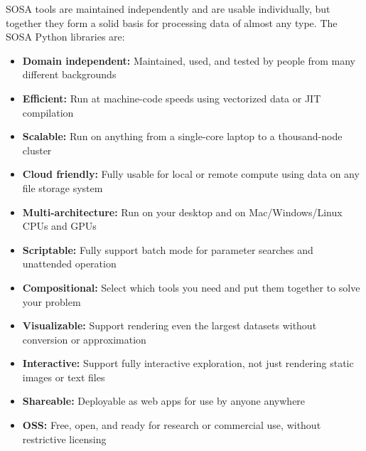 SOSA tools are maintained independently and are usable individually, but together they form a solid basis for processing data of almost any type. The SOSA Python libraries are:

\begin{itemize}
  \item\textbf{Domain independent:} Maintained, used, and tested by people from many different backgrounds
  \item\textbf{Efficient:} Run at machine-code speeds using vectorized data or JIT compilation
  \item\textbf{Scalable:} Run on anything from a single-core laptop to a thousand-node cluster
  \item\textbf{Cloud friendly:} Fully usable for local or remote compute using data on any file storage system
  \item\textbf{Multi-architecture:} Run on your desktop and on Mac/Windows/Linux CPUs and GPUs
  \item\textbf{Scriptable:} Fully support batch mode for parameter searches and unattended operation
  \item\textbf{Compositional:} Select which tools you need and put them together to solve your problem
  \item\textbf{Visualizable:} Support rendering even the largest datasets without conversion or approximation
  \item\textbf{Interactive:} Support fully interactive exploration, not just rendering static images or text files
  \item\textbf{Shareable:} Deployable as web apps for use by anyone anywhere
  \item\textbf{OSS:} Free, open, and ready for research or commercial use, without restrictive licensing
\end{itemize}

